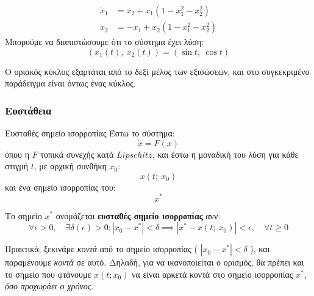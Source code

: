 \documentclass[11pt,a4paper,notitlepage,fleqn]{article}
\begin{document}
\begin{exercise}[Παράδειγμα]
	\begin{align*}
		\dot x_1 &= x_2 + x_1(1-x_1^2-x_2^2) \\
		\dot x_2 &= -x_1+x_2(1-x_1^2-x_2^2)
	\end{align*}
	\tcblower
	Μπορούμε να διαπιστώσουμε ότι το σύστημα έχει λύση:
	\[
	\left(
	x_1(t),\ x_2(t)
	\right) = \left(
	\sin t,\ \cos t
	\right)
	\]

	Ο οριακός κύκλος εξαρτάται από το δεξί μέλος των εξισώσεων, και στο συγκεκριμένο
	παράδειγμα είναι όντως ένας κύκλος.
\end{exercise}

\subsubsection{Ευστάθεια}
\begin{defn}{Ευσταθές σημείο ισορροπίας}{}
	Έστω το σύστημα:
	\[
	\dot x = F(x)
	\]
	όπου η \( F \) τοπικά συνεχής κατά \( Lipschitz \),
	και έστω η μοναδική του λύση για κάθε στιγμή \( t \), με αρχική συνθήκη \( x_0 \):
	\[
	x(t;\ x_0)
	\]
	και ένα σημείο ισορροπίας του:
	\[
	x^*
	\]

	Το σημείο \( x^* \) ονομάζεται \textbf{ευσταθές σημείο ισορροπίας} ανν:
	\[
	\forall \epsilon > 0,\quad
	\exists \delta(\epsilon) > 0 :
	\left|x_0-x^*\right| < \delta
	\implies \left| x^*-x(t;\ x_0) \right| < \epsilon,\quad \forall t \geq 0
	\]
\end{defn}

Πρακτικά, ξεκινάμε \textit{κοντά} από το σημείο ισορροπίας ( \( \left|x_0-x^*\right| < \delta \) ), και παραμένουμε \textit{κοντά}
σε αυτό. Δηλαδή, για να ικανοποιείται ο ορισμός, θα
πρέπει και το σημείο που φτάνουμε \( x(t; x_0) \) να είναι αρκετά κοντά στο σημείο ισορροπίας
\( x^* \), \textit{όσο προχωράει ο χρόνος}.
\end{document}
